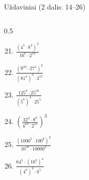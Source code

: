 \documentclass[aspectratio=169,10pt]{beamer}
\begin{document}
\begin{frame}{Uždaviniai (2 dalis: 14--26)}
\begin{columns}[T]
\begin{column}{0.5\textwidth}
            \begin{enumerate}

                \setcounter{enumi}{20}

                \item
                $\frac{
                (4^5\cdot8^3)^2
                }{
                16^6\cdot2^{10}
                }$

                \item
                $\frac{
                (9^{10}\cdot27^5)^2
                }{
                (81^4)^3\cdot3^{15}
                }$

                \item
                $\frac{
                125^8\cdot25^{10}
                }{
                (5^6)^4\cdot25^5
                }$

                \item
                $\left(
                \frac{
                32^4\cdot8^6
                }{
                4^{10}\cdot2^{15}
                }
                \right)^3$

                \item
                $\frac{
                (1000^5\cdot100^8)^2
                }{
                10^{50}\cdot10000^2
                }$

                \item
                $\frac{
                64^5\cdot(16^3)^4
                }{
                (4^8)^3\cdot8^5
                }$

            \end{enumerate}

        \end{column}

    \end{columns}

\end{frame}
\end{document}
